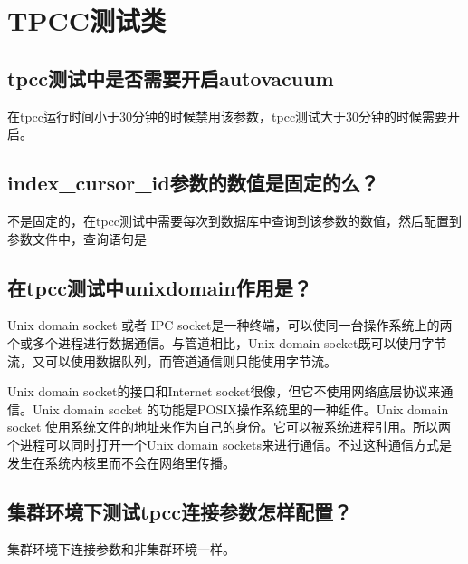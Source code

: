 \documentclass[letterpaper,10pt,english]{sphinxmanual}
\begin{document}
\chapter{TPCC测试类}
\label{\detokenize{TPCC-test:tpcc}}\label{\detokenize{TPCC-test::doc}}

\section{tpcc测试中是否需要开启autovacuum}
\label{\detokenize{TPCC-test:tpccautovacuum}}
在tpcc运行时间小于30分钟的时候禁用该参数，tpcc测试大于30分钟的时候需要开启。


\section{index\_cursor\_id参数的数值是固定的么？}
\label{\detokenize{TPCC-test:index-cursor-id}}
不是固定的，在tpcc测试中需要每次到数据库中查询到该参数的数值，然后配置到参数文件中，查询语句是

\begin{sphinxVerbatim}[commandchars=\\\{\}]
      
\end{sphinxVerbatim}


\section{在tpcc测试中unixdomain作用是？}
\label{\detokenize{TPCC-test:tpccunixdomain}}
Unix domain socket 或者 IPC socket是一种终端，可以使同一台操作系统上的两个或多个进程进行数据通信。与管道相比，Unix domain socket既可以使用字节流，又可以使用数据队列，而管道通信则只能使用字节流。

Unix domain socket的接口和Internet socket很像，但它不使用网络底层协议来通信。Unix domain socket 的功能是POSIX操作系统里的一种组件。Unix domain socket 使用系统文件的地址来作为自己的身份。它可以被系统进程引用。所以两个进程可以同时打开一个Unix domain sockets来进行通信。不过这种通信方式是发生在系统内核里而不会在网络里传播。


\section{集群环境下测试tpcc连接参数怎样配置？}
\label{\detokenize{TPCC-test:id1}}
集群环境下连接参数和非集群环境一样。
\end{document}
